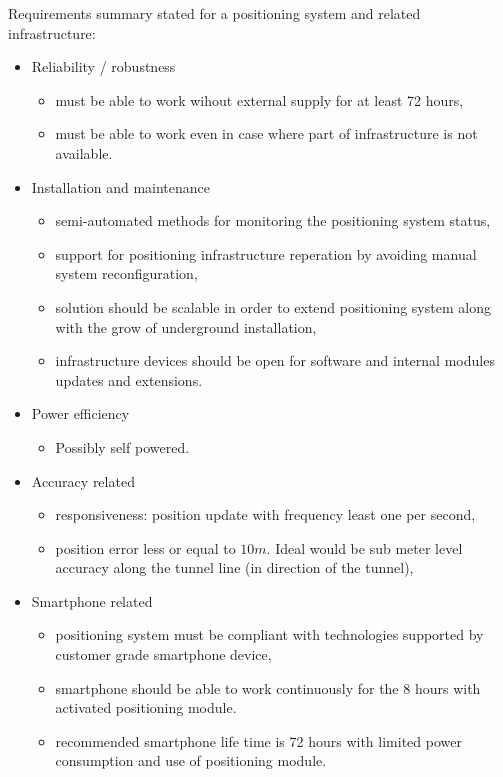 \documentclass[../main.tex]{subfiles}
\begin{document}
Requirements summary stated for a positioning system and related infrastructure:
\begin{itemize}
	\item Reliability / robustness
	\begin{itemize}
		\item must be able to work wihout external supply for at least 72 hours,
		\item must be able to work even in case where part of infrastructure is not available.
	\end{itemize}
	\item Installation and maintenance
	\begin{itemize}
		\item semi-automated methods for monitoring the positioning system status,
		\item support for positioning infrastructure reperation by avoiding manual system reconfiguration,
		\item solution should be scalable in order to extend positioning system along with the grow of underground installation,
		\item infrastructure devices should be open for software and internal modules updates and extensions.
	\end{itemize}
	\item Power efficiency
	\begin{itemize}
		\item Possibly self powered.
	\end{itemize}
	\item Accuracy related
	\begin{itemize}
		\item responsiveness: position update with frequency least one per second,
		\item position error less or equal to $10m$. Ideal would be sub meter level accuracy along the tunnel line (in direction of the tunnel),
	\end{itemize}
	\item Smartphone related
	\begin{itemize}
		\item positioning system must be compliant with technologies supported by customer grade smartphone device,
		\item smartphone should be able to work continuously for the 8 hours with activated positioning module.
		\item recommended smartphone life time is 72 hours with limited power consumption and use of positioning module.

\end{itemize}
\end{itemize}
\end{document}
